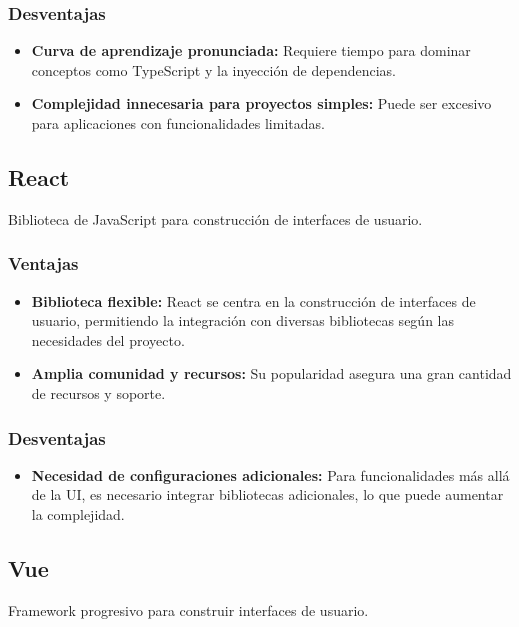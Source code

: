 \subsubsection{Desventajas}
\begin{itemize}
    \item \textbf{Curva de aprendizaje pronunciada:} Requiere tiempo para dominar conceptos como TypeScript y la inyección de dependencias.
    
    \item \textbf{Complejidad innecesaria para proyectos simples:} Puede ser excesivo para aplicaciones con funcionalidades limitadas.
\end{itemize}

\subsection{React}
Biblioteca de JavaScript para construcción de interfaces de usuario.

\subsubsection{Ventajas}
\begin{itemize}
    \item \textbf{Biblioteca flexible:} React se centra en la construcción de interfaces de usuario, permitiendo la integración con diversas bibliotecas según las necesidades del proyecto.
    
    \item \textbf{Amplia comunidad y recursos:} Su popularidad asegura una gran cantidad de recursos y soporte.
\end{itemize}

\subsubsection{Desventajas}
\begin{itemize}
    \item \textbf{Necesidad de configuraciones adicionales:} Para funcionalidades más allá de la UI, es necesario integrar bibliotecas adicionales, lo que puede aumentar la complejidad.
\end{itemize}

\subsection{Vue}
Framework progresivo para construir interfaces de usuario.

